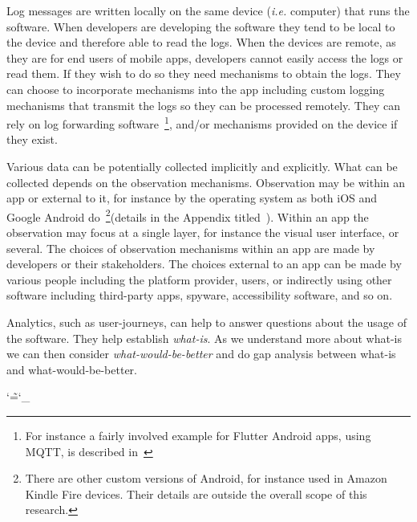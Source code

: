 Log messages are written locally on the same device (\textit{i.e.} computer) that runs the software. When developers are developing the software they tend to be local to the device and therefore able to read the logs. When the devices are remote, as they are for end users of mobile apps, developers cannot easily access the logs or read them. If they wish to do so they need mechanisms to obtain the logs. They can choose to incorporate mechanisms into the app including custom logging mechanisms that transmit the logs so they can be processed remotely. They can rely on log forwarding software~\footnote{For instance a fairly involved example for Flutter Android apps, using MQTT, is described in~\citep{adil2020_sending_logs_from_flutter_apps}}, and/or mechanisms provided on the device if they exist.


Various data can be potentially collected implicitly and explicitly. What can be collected depends on the observation mechanisms. Observation may be within an app or external to it, for instance by the operating system as both iOS  and Google Android do~\footnote{There are other custom versions of Android, for instance used in Amazon Kindle Fire devices. Their details are outside the overall scope of this research.}(details in the Appendix titled~\href{chapter-on-mobile-analytics}{\emph{}}). Within an app the observation may focus at a single layer, for instance the visual user interface, or several. The choices of observation mechanisms within an app are made by developers or their stakeholders. The choices external to an app can be made by various people including the platform provider, users, or indirectly using other software including third-party apps, spyware, accessibility software, and so on.

Analytics, such as user-journeys, can help to answer questions about the usage of the software. They help establish \emph{what-is}. As we understand more about what-is we can then consider \emph{what-would-be-better} and do gap analysis between what-is and what-would-be-better.

\makeatletter
\DeclareRobustCommand*{\escapeus}[1]{%
    \begingroup\@activeus\scantokens{#1\endinput}\endgroup}
\begingroup\lccode`\~=`\_\relax
    \lowercase{\endgroup\def\@activeus{\catcode`\_=\active \let~\_}}
\makeatother

